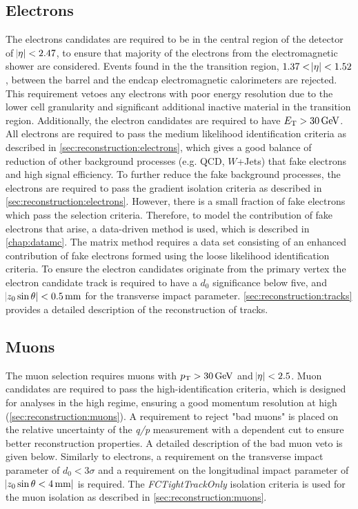 \subsection{Electrons}\label{sec:selee}
The electrons candidates are required to be in the central region of the detector of $\abs{\eta} < 2.47$, to ensure that majority of the electrons from the electromagnetic shower are considered. Events found in the the transition region, $1.37 < \abs{\eta} < 1.52$, between the barrel and the endcap electromagnetic calorimeters are rejected. This requirement vetoes any electrons with poor energy resolution due to the lower cell granularity and significant additional inactive material in the transition region. Additionally, the electron candidates are required to have $E_{\text{T}} > \SI{30}{\giga\electronvolt}$. All electrons are required to pass the medium likelihood identification criteria as described in \cref{sec:reconstruction:electrons}, which gives a good balance of reduction of other background processes (e.g. QCD, $W$+Jets) that fake electrons and high signal efficiency. To further reduce the fake background processes, the electrons are required to pass the gradient isolation criteria as described in \cref{sec:reconstruction:electrons}. However, there is a small fraction of fake electrons which pass the selection criteria. Therefore, to model the contribution of fake electrons that arise, a data-driven method is used, which is described in \cref{chap:datamc}. The matrix method requires a data set consisting of an enhanced contribution of fake electrons formed using the loose likelihood identification criteria. To ensure the electron candidates originate from the primary vertex the electron candidate track is required to have a $d_0$ significance below five, and $\abs{z_0 \sin\theta} < \SI{0.5}{\milli\meter}$ for the transverse impact parameter. \cref{sec:reconstruction:tracks} provides a detailed description of the reconstruction of tracks.

\subsection{Muons}\label{sec:selmm}
The muon selection requires muons with $p_{\text{T}} > \SI{30}{\giga\electronvolt}$ and $\abs{\eta} < 2.5$. Muon candidates are required to pass the high-\pt identification criteria, which is designed for analyses in the high \pt regime, ensuring a good momentum resolution at high \pt (\cref{sec:reconstruction:muons}). A requirement to reject "bad muons" is placed on the relative uncertainty of the \emph{q/p} measurement with a \pt dependent cut to ensure better reconstruction properties. A detailed description of the bad muon veto is given below. Similarly to electrons, a requirement on the transverse impact parameter of $d_0 < 3 \sigma$ and a requirement on the longitudinal impact parameter of $\abs{z_0\sin\theta < \SI{4}{\milli\meter}}$ is required. The \emph{FCTightTrackOnly} isolation criteria is used for the muon isolation as described in \cref{sec:reconstruction:muons}.

